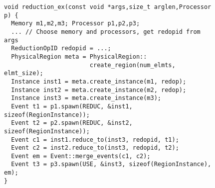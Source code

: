 \begin{figure}
\begin{lrbox}{\mylistingbox}
\begin{lstlisting}
void reduction_ex(const void *args,size_t arglen,Processor p) {
  Memory m1,m2,m3; Processor p1,p2,p3;
  ... // Choose memory and processors, get redopid from args
  ReductionOpID redopid = ...;
  PhysicalRegion meta = PhysicalRegion::
                        create_region(num_elmts, elmt_size);
  Instance inst1 = meta.create_instance(m1, redop);
  Instance inst2 = meta.create_instance(m2, redop);
  Instance inst3 = meta.create_instance(m3);
  Event t1 = p1.spawn(REDUC, &inst1, sizeof(RegionInstance));
  Event t2 = p2.spawn(REDUC, &inst2, sizeof(RegionInstance));
  Event c1 = inst1.reduce_to(inst3, redopid, t1);
  Event c2 = inst2.reduce_to(inst3, redopid, t2);
  Event em = Event::merge_events(c1, c2);
  Event t3 = p3.spawn(USE, &inst3, sizeof(RegionInstance), em);
}
\end{lstlisting}
\end{lrbox}
\subfigure{\usebox{\mylistingbox}} \\

\end{figure}
